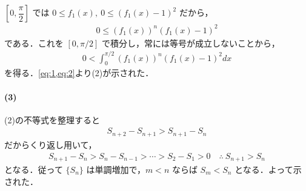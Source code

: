 \documentclass[../../main.tex]{subfiles}
\begin{document}
$\left[0,\dfrac{\pi}{2}\right]$ では $0\le f_1(x),\ 0\le(f_1(x)-1)^2$ だから，
\begin{align}
  0\le \left(f_1(x)\right)^n(f_1(x)-1)^2
\end{align}
である．これを $[0,\pi/2]$ で積分し，常には等号が成立しないことから，
\begin{align}
  0<\int_0^{\pi/2}\left(f_1(x)\right)^n(f_1(x)-1)^2 dx \label{eq:2}
\end{align}
を得る．\cref{eq:1,eq:2}より(2)が示された．

\paragraph{(3)}
(2)の不等式を整理すると
\begin{align}
  S_{n+2}-S_{n+1} > S_{n+1}-S_{n}
\end{align}
だからくり返し用いて，
\begin{align}
  S_{n+1}-S_n>S_n-S_{n-1}>\cdots>S_2-S_1>0 \quad\therefore\ S_{n+1}>S_n
\end{align}
となる．従って $\{S_n\}$ は単調増加で，$m<n$ ならば $S_m<S_n$ となる．よって示された．

\newpage
\end{document}

